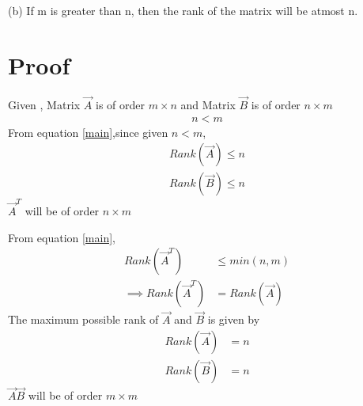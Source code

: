 \documentclass[journal,12pt,twocolumn]{IEEEtran}
\begin{document}
(b) If m is greater than n, then the rank of the matrix will be atmost n.

\section{Proof}
Given , 
Matrix $\vec{A}$ is of order $m \times n$ and 
Matrix $\vec{B}$ is of order $n \times m$
\begin{align}
n<m 
\end{align}
From equation \eqref{main},since given $n<m$,
\begin{align}
    Rank(\vec{A})\leq n\\
    Rank(\vec{B})\leq n
\end{align}
$\vec{A}^T$ will be of order $n \times m$

From equation \eqref{main},
\begin{align}
    Rank(\vec{A}^T) &\leq min(n,m) \\
    \implies Rank(\vec{A}^T) &= Rank(\vec{A})\label{eq}
\end{align}
The maximum possible rank of $\vec{A}$ and $\vec{B}$ is given by 
\begin{align}
    Rank(\vec{A})&=n\label{a}\\
    Rank(\vec{B})&=n\label{2}
\end{align}
$\vec{A}\vec{B}$ will be of order $m \times m$
\end{document}
